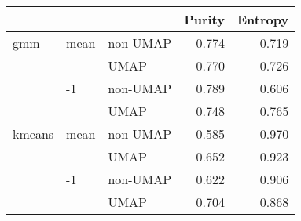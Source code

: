 \begin{tabular}{lllrr}
\toprule
       &    &      &  Purity &  Entropy \\
\midrule
gmm & mean & non-UMAP &   0.774 &    0.719 \\
       &    & UMAP &   0.770 &    0.726 \\
       & -1 & non-UMAP &   0.789 &    0.606 \\
       &    & UMAP &   0.748 &    0.765 \\
kmeans & mean & non-UMAP &   0.585 &    0.970 \\
       &    & UMAP &   0.652 &    0.923 \\
       & -1 & non-UMAP &   0.622 &    0.906 \\
       &    & UMAP &   0.704 &    0.868 \\
\bottomrule
\end{tabular}
